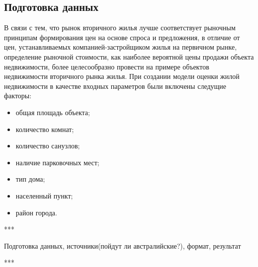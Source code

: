 \subsection{Подготовка данных}
\label{sec:experiment:data_preparation}

В связи с тем, что рынок вторичного жилья лучше соответствует рыночным принципам формирования цен на основе спроса и
предложения, в отличие от цен, устанавливаемых компанией-застройщиком жилья на первичном рынке, определение рыночной
стоимости, как наиболее вероятной цены продажи объекта недвижимости, более целесообразно провести на примере объектов
недвижимости вторичного рынка жилья. При создании модели оценки жилой недвижимости в качестве входных параметров были включены
следущие факторы:
\begin{itemize}
  \item общая площадь объекта;
  \item количество комнат;
  \item количество санузлов;
  \item наличие парковочных мест;
  \item тип дома;
  \item населенный пункт;
  \item район города.
\end{itemize}

***

Подготовка данных, источники(пойдут ли австралийские?), формат, результат

***
